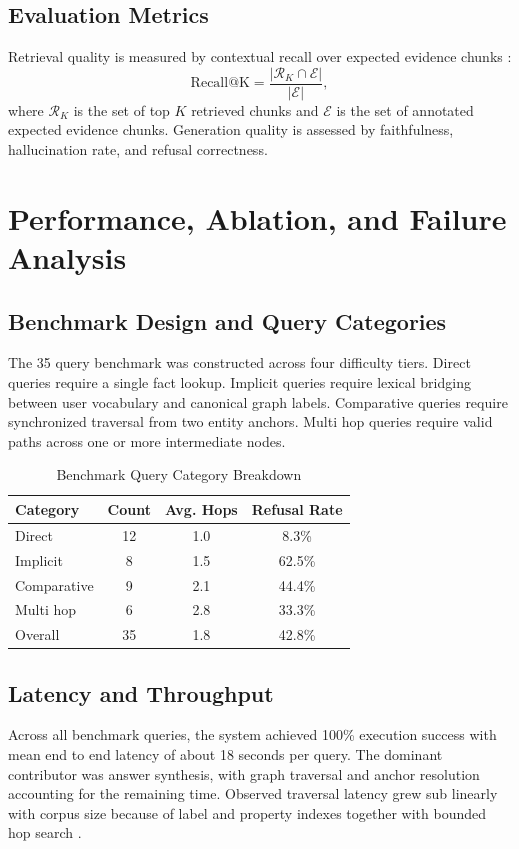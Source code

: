 \documentclass[conference]{IEEEtran}
\begin{document}
\subsection{Evaluation Metrics}
Retrieval quality is measured by contextual recall over expected evidence chunks \cite{msmarco2016,trec2020}:
\begin{equation}
  \mathrm{Recall@K} =
  \frac{|\mathcal{R}_K \cap \mathcal{E}|}{|\mathcal{E}|},
\end{equation}
where $\mathcal{R}_K$ is the set of top $K$ retrieved chunks and $\mathcal{E}$ is the set of annotated expected evidence chunks. Generation quality is assessed by faithfulness, hallucination rate, and refusal correctness.

\section{Performance, Ablation, and Failure Analysis}
\subsection{Benchmark Design and Query Categories}
The 35 query benchmark was constructed across four difficulty tiers. Direct queries require a single fact lookup. Implicit queries require lexical bridging between user vocabulary and canonical graph labels. Comparative queries require synchronized traversal from two entity anchors. Multi hop queries require valid paths across one or more intermediate nodes.

\begin{table}[htbp]
  \caption{Benchmark Query Category Breakdown}
  \label{tab:query_cats}
  \centering
  \begin{tabular}{lccc}
    \toprule
    Category & Count & Avg. Hops & Refusal Rate \\
    \midrule
    Direct & 12 & 1.0 & 8.3\% \\
    Implicit & 8 & 1.5 & 62.5\% \\
    Comparative & 9 & 2.1 & 44.4\% \\
    Multi hop & 6 & 2.8 & 33.3\% \\
    \midrule
    Overall & 35 & 1.8 & 42.8\% \\
    \bottomrule
  \end{tabular}
\end{table}

\subsection{Latency and Throughput}
Across all benchmark queries, the system achieved 100\% execution success with mean end to end latency of about 18 seconds per query. The dominant contributor was answer synthesis, with graph traversal and anchor resolution accounting for the remaining time. Observed traversal latency grew sub linearly with corpus size because of label and property indexes together with bounded hop search \cite{angles2018propertygraphs,robinson2015graphdb}.
\end{document}
